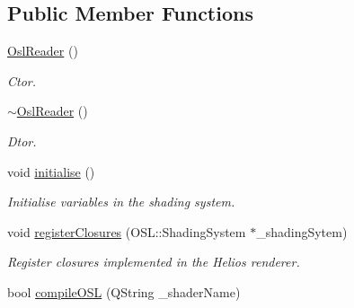 \subsection*{Public Member Functions}
\begin{DoxyCompactItemize}
\item 
\hypertarget{class_osl_reader_a2b3269d19d6d1ae5664f2d73d023fb18}{\hyperlink{class_osl_reader_a2b3269d19d6d1ae5664f2d73d023fb18}{Osl\-Reader} ()}\label{class_osl_reader_a2b3269d19d6d1ae5664f2d73d023fb18}

\begin{DoxyCompactList}\small\item\em Ctor. \end{DoxyCompactList}\item 
\hypertarget{class_osl_reader_a5ef824cc5f8360819edc3392ccf21c4e}{\hyperlink{class_osl_reader_a5ef824cc5f8360819edc3392ccf21c4e}{$\sim$\-Osl\-Reader} ()}\label{class_osl_reader_a5ef824cc5f8360819edc3392ccf21c4e}

\begin{DoxyCompactList}\small\item\em Dtor. \end{DoxyCompactList}\item 
\hypertarget{class_osl_reader_a2913e7de22ec59fd2f01946d2eaa2ca4}{void \hyperlink{class_osl_reader_a2913e7de22ec59fd2f01946d2eaa2ca4}{initialise} ()}\label{class_osl_reader_a2913e7de22ec59fd2f01946d2eaa2ca4}

\begin{DoxyCompactList}\small\item\em Initialise variables in the shading system. \end{DoxyCompactList}\item 
\hypertarget{class_osl_reader_acccc7409dcde3706e224c1b670e88d5f}{void \hyperlink{class_osl_reader_acccc7409dcde3706e224c1b670e88d5f}{register\-Closures} (O\-S\-L\-::\-Shading\-System $\ast$\-\_\-shading\-Sytem)}\label{class_osl_reader_acccc7409dcde3706e224c1b670e88d5f}

\begin{DoxyCompactList}\small\item\em Register closures implemented in the Helios renderer. \end{DoxyCompactList}\item 
\hypertarget{class_osl_reader_aa7d88ba8ec7014fa7f1e35e82d977a6e}{bool \hyperlink{class_osl_reader_aa7d88ba8ec7014fa7f1e35e82d977a6e}{compile\-O\-S\-L} (Q\-String \-\_\-shader\-Name)}\label{class_osl_reader_aa7d88ba8ec7014fa7f1e35e82d977a6e}


\end{DoxyCompactItemize}
